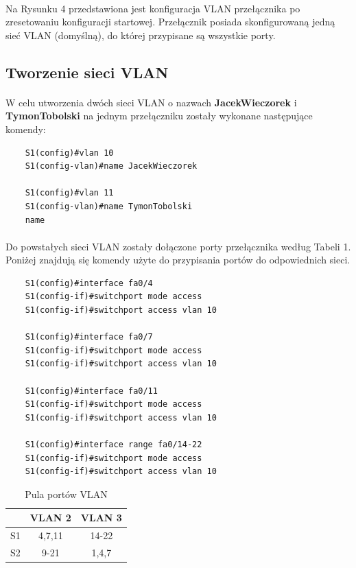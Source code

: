 \documentclass[wide,a4paper,titlepage,12pt] {article}
\begin{document}
  \paragraph{}
  Na Rysunku 4 przedstawiona jest konfiguracja VLAN przełącznika po zresetowaniu konfiguracji startowej. Przełącznik posiada skonfigurowaną jedną sieć VLAN (domyślną), do której przypisane są wszystkie porty.


  \subsection{Tworzenie sieci VLAN}
  \paragraph{}
  W celu utworzenia dwóch sieci VLAN o nazwach \textbf{JacekWieczorek} i \textbf{TymonTobolski} na jednym przełączniku zostały wykonane następujące komendy:
  \begin{verbatim}
    S1(config)#vlan 10
    S1(config-vlan)#name JacekWieczorek

    S1(config)#vlan 11
    S1(config-vlan)#name TymonTobolski
    name
  \end{verbatim}

  \paragraph{}
  Do powstałych sieci VLAN zostały dołączone porty przełącznika według Tabeli 1.
  Poniżej znajdują się komendy użyte do przypisania portów do odpowiednich sieci.

  \begin{verbatim}
    S1(config)#interface fa0/4
    S1(config-if)#switchport mode access
    S1(config-if)#switchport access vlan 10

    S1(config)#interface fa0/7
    S1(config-if)#switchport mode access
    S1(config-if)#switchport access vlan 10

    S1(config)#interface fa0/11
    S1(config-if)#switchport mode access
    S1(config-if)#switchport access vlan 10

    S1(config)#interface range fa0/14-22
    S1(config-if)#switchport mode access
    S1(config-if)#switchport access vlan 10
  \end{verbatim}


  \begin{table}[H]
    \begin{center}
      \begin{tabular}{|c|c|c|}
      \hline
      & VLAN 2 & VLAN 3 \\
      \hline
      S1 & 4,7,11 & 14-22 \\
      \hline
      S2 & 9-21 & 1,4,7 \\
      \hline
      \end{tabular}
    \end{center}
    \caption{Pula portów VLAN}
  \end{table}
\end{document}
